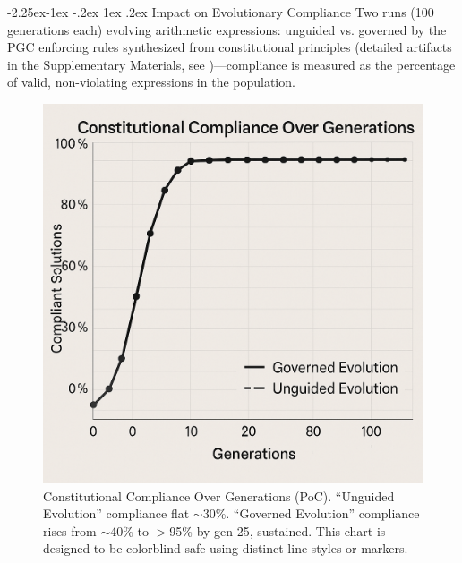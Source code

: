 \documentclass[manuscript,screen,review,anonymous,9pt]{acmart}
\makeatletter
\renewcommand\subsection{\@startsection{subsection}{2}{\z@}%
  {-2.25ex\@plus -1ex \@minus -.2ex}%
  {1ex \@plus .2ex}%
  {\normalfont\large\bfseries}}
\makeatother
\begin{document}
\subsection{Impact on Evolutionary Compliance}
\label{subsec:impact_compliance}
Two runs (100 generations each) evolving arithmetic expressions: unguided vs. governed by the PGC enforcing rules synthesized from constitutional principles (detailed artifacts in the Supplementary Materials, see )—compliance is measured as the percentage of valid, non-violating expressions in the population.

\begin{figure}[htbp]
	\centering
	\includegraphics[width=\linewidth,keepaspectratio]{Figure 4_ Constitutional Compliance Over Generations.png}
	\caption[Constitutional compliance over generations line chart]{Constitutional Compliance Over Generations (PoC). ``Unguided Evolution'' compliance flat $\sim$30\%. ``Governed Evolution'' compliance rises from $\sim$40\% to $>$95\% by gen 25, sustained. This chart is designed to be colorblind-safe using distinct line styles or markers.}
	\label{fig:compliance_over_generations}
\end{figure}
\end{document}
